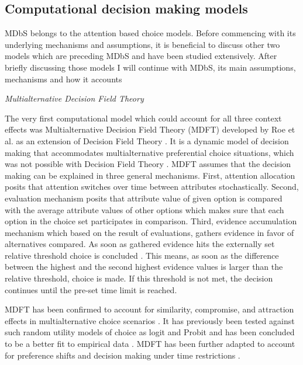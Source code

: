 \documentclass[a4paper,12pt]{article}
\newcommand{\citeyearonly}[1]{\citeyearpar{#1}}
\begin{document}
\subsection{Computational decision making models}

MDbS belongs to the attention based choice models. Before commencing with its underlying mechanisms and assumptions, it is beneficial to discuss other two models which are preceding MDbS and have been studied extensively. After briefly discussing those models I will continue with MDbS, its main assumptions, mechanisms and how it accounts 

\textit{Multialternative Decision Field Theory}

The very first computational model which could account for all three context effects was Multialternative Decision Field Theory (MDFT) developed by Roe et al. \citeyearonly{roe2001multialternative} as an extension of Decision Field Theory \citep{busemeyer1993decision}. It is a dynamic model of decision making that accommodates multialternative preferential choice situations, which was not possible with Decision Field Theory \citep{hotaling2019quantitative}. MDFT assumes that the decision making can be explained in three general mechanisms. First, attention allocation posits that attention switches over time between attributes stochastically. Second, evaluation mechanism posits that attribute value of given option is compared with the average attribute values of other options  which makes sure that each option in the choice set participates in comparison. Third, evidence accumulation mechanism which based on the result of evaluations, gathers evidence in favor of alternatives compared. As soon as gathered evidence hits the externally set relative threshold choice is concluded \citep{busemeyer2002survey}. This means, as soon as the difference between the highest and the second highest evidence values is larger than the relative threshold, choice is made. If this threshold is not met, the decision continues until the pre-set time limit is reached.

MDFT has been confirmed to account for similarity, compromise, and attraction effects in multialternative choice scenarios \citep{roe2001multialternative}. It has previously been tested against such random utility models of choice as logit and Probit and has been concluded to be a better fit to empirical data \citep{berkowitsch2014rigorously}. 
MDFT has been further adapted to account for preference shifts \citep{mohr2017attraction} and decision making under time restrictions \citep{diederich2003mdft}.
\end{document}
